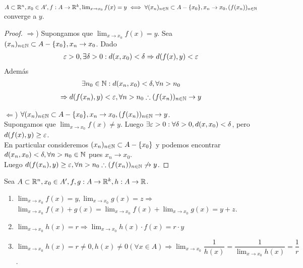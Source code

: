 \begin{prop}
  $A \subset \mathbb{R}^n, x_0 \in A^{\prime}, f: A \to \mathbb{R}^k, \lim_{x \to x_0} f(x) = y \iff \forall (x_n)_{n \in \mathbb{N}} \subset A - \{x_0\}, x_n \to x_0, (f(x_n))_{n \in \mathbb{N}}$ converge a $y$.
  \begin{proof}
    $\Rightarrow$) Supongamos que $\lim_{x \to x_0} f(x) = y$. Sea $(x_n)_{n \in \mathbb{N}} \subset A - \{x_0\}, x_n \to x_0$. Dado \begin{align*}
      \varepsilon > 0, \exists \delta > 0 : d(x, x_0) < \delta \Rightarrow d(f(x), y) < \varepsilon
    \end{align*} Además \begin{align*}
      \exists n_0 \in \mathbb{N} : d(x_n, x_0) < \delta, \forall n > n_0
    \end{align*} \begin{align*} \Rightarrow d(f(x_n), y) < \varepsilon, \forall n > n_0 \therefore (f(x_n))_{n \in \mathbb{N}} \to y \end{align*}

    $\Leftarrow$) $\forall (x_n)_{n \in \mathbb{N}} \subset A - \{x_0\}, x_n \to x_0, (f(x_n))_{n \in \mathbb{N}} \to y$. \\
    Supongamos que $\lim_{x \to x_0} f(x) \neq y$. Luego $\exists \varepsilon > 0 : \forall \delta > 0, d(x, x_0) < \delta$, pero $d(f(x), y) \geq \varepsilon$. \\
    En particular consideremos $(x_n)_{n \in \mathbb{N}} \subset A - \{x_0\}$ y podemos encontrar $d(x_n, x_0) < \delta, \forall n > n_0 \in \mathbb{N}$ pues $x_n \to x_0$. \\
    Luego $d(f(x_n), y) \geq \varepsilon, \forall n > n_0 \therefore (f(x_n))_{n \in \mathbb{N}} \not \to y$.
  \end{proof}
\end{prop}

\begin{prop}
  Sea $A \subset \mathbb{R}^n, x_0 \in A^{\prime}, f, g: A \to \mathbb{R}^k, h: A \to \mathbb{R}$.
  \begin{enumerate}
    \item $\lim_{x \to x_0} f(x) = y, \lim_{x \to x_0} g(x) = z \Rightarrow$ \\ $\lim_{x \to x_0} f(x) + g(x) = \lim_{x \to x_0} f(x) + \lim_{x \to x_0} g(x) = y+z$.
    \item $\lim_{x \to x_0} h(x) = r \Rightarrow \lim_{x \to x_0} h(x) \cdot f(x) = r \cdot y$
    \item $\lim_{x \to x_0} h(x) = r \neq 0, h(x) \neq 0 (\forall x \in A) \Rightarrow \lim_{x \to x_0} \dfrac{1}{h(x)} = \dfrac{1}{\lim_{x \to x_0} h(x)} = \dfrac{1}{r}$.
  \end{enumerate}
\end{prop}

